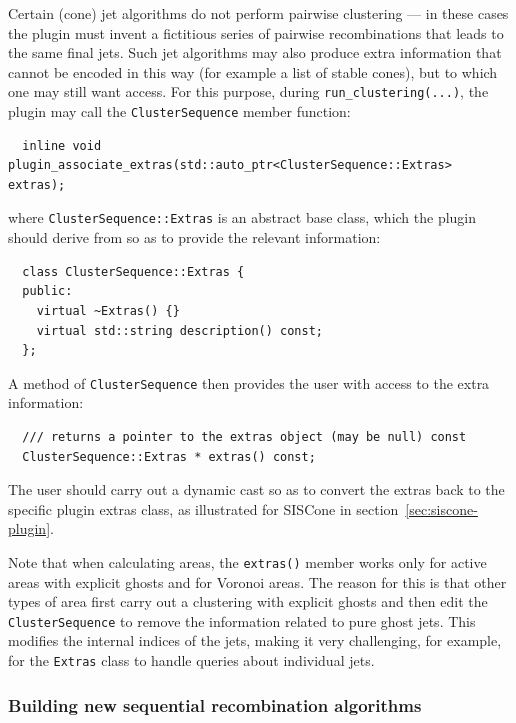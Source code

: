 \documentclass[12pt,a4]{article}
\newcommand{\ttt}[1]{{\small\texttt{#1}}}
\begin{document}
Certain (cone) jet algorithms do not perform pairwise clustering ---
in these cases the plugin must invent a fictitious series of pairwise
recombinations that leads to the same final jets. Such jet algorithms
may also produce extra information that cannot be encoded in this way
(for example a list of stable cones), but to which one may still want
access. For this purpose, during \verb|run_clustering(...)|, the
plugin may call the \verb|ClusterSequence| member function:
\begin{lstlisting}
  inline void plugin_associate_extras(std::auto_ptr<ClusterSequence::Extras> extras);
\end{lstlisting}
where \verb|ClusterSequence::Extras| is an abstract base class, which
the plugin should derive from so as to provide the relevant information:
\begin{lstlisting}
  class ClusterSequence::Extras {
  public:
    virtual ~Extras() {}
    virtual std::string description() const;
  };
\end{lstlisting}
A method of \verb|ClusterSequence| then provides the user with access
to the extra information:
\begin{lstlisting}
  /// returns a pointer to the extras object (may be null) const
  ClusterSequence::Extras * extras() const;
\end{lstlisting}
The user should carry out a dynamic cast so as to convert the extras
back to the specific plugin extras class, as illustrated for
SISCone in section~\ref{sec:siscone-plugin}.

Note that when calculating areas, the \ttt{extras()} member works
only for active areas with explicit ghosts and for Voronoi areas. 
%
The reason for this is that other types of area first carry out a
clustering with explicit ghosts and then edit the
\ttt{ClusterSequence} to remove the information related to pure ghost
jets.
%
This modifies the internal indices of the jets, making it very
challenging, for example, for the \ttt{Extras} class to handle queries
about individual jets.

\subsubsection{Building new sequential recombination algorithms}
\label{sec:new-seq-rec}
\end{document}
